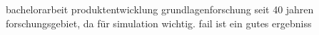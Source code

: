 bachelorarbeit produktentwicklung grundlagenforschung
seit 40 jahren forschungsgebiet, da für simulation wichtig.
fail ist ein gutes ergebniss
